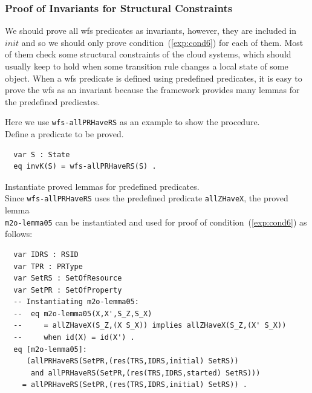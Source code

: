 \documentclass[12pt]{report}
\begin{document}
\subsubsection*{Proof of Invariants for Structural Constraints}
We should prove all wfs predicates as invariants, however, they are
included in $init$ and so we should only prove
condition~(\ref{exp:cond6}) for each of them. Most of them check some
structural constraints of the cloud systems, which should usually keep
to hold when some transition rule changes a local state of some
object. When a wfs predicate is defined using predefined predicates, it
is easy to prove the wfs as an invariant because the framework
provides many lemmas for the predefined predicates.

Here we use {\tt wfs-allPRHaveRS} as an example to show the procedure.\\

 Define a predicate to be proved. 
\small
\begin{verbatim}
  var S : State
  eq invK(S) = wfs-allPRHaveRS(S) .
\end{verbatim}
\normalsize

 Instantiate proved lemmas for predefined
predicates. \\ Since {\tt wfs-allPRHaveRS} uses the predefined
predicate {\tt allZHaveX}, the proved lemma \\ {\tt m2o-lemma05} can be
instantiated and used for proof of condition~(\ref{exp:cond6}) as
follows:
\small
\begin{verbatim}
  var IDRS : RSID 
  var TPR : PRType
  var SetRS : SetOfResource
  var SetPR : SetOfProperty
  -- Instantiating m2o-lemma05:
  --  eq m2o-lemma05(X,X',S_Z,S_X) 
  --     = allZHaveX(S_Z,(X S_X)) implies allZHaveX(S_Z,(X' S_X))
  --     when id(X) = id(X') .
  eq [m2o-lemma05]:
     (allPRHaveRS(SetPR,(res(TRS,IDRS,initial) SetRS))
      and allPRHaveRS(SetPR,(res(TRS,IDRS,started) SetRS)))
    = allPRHaveRS(SetPR,(res(TRS,IDRS,initial) SetRS)) .
\end{verbatim}
\normalsize
\end{document}
